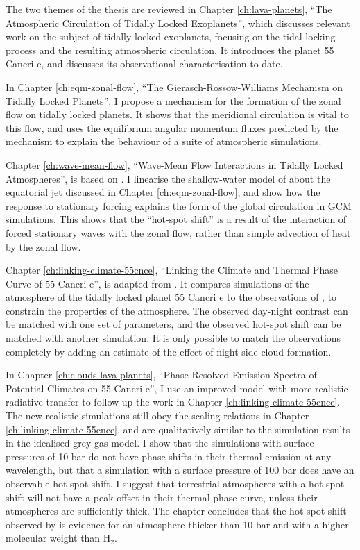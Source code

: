 The two themes of the thesis are reviewed in Chapter \ref{ch:lava-planets}, ``The Atmospheric Circulation of Tidally Locked Exoplanets'', which discusses relevant work on the subject of tidally locked exoplanets, focusing on the tidal locking process and the resulting atmospheric circulation. It introduces the planet 55 Cancri e, and discusses its observational characterisation to date.

In Chapter \ref{ch:eqm-zonal-flow}, ``The Gierasch-Rossow-Williams Mechanism on Tidally Locked Planets'', I propose a mechanism for the formation of the zonal flow on tidally locked planets. It shows that the meridional circulation is vital to this flow, and uses the equilibrium angular momentum fluxes predicted by the mechanism to explain the behaviour of a suite of atmospheric simulations.

Chapter \ref{ch:wave-mean-flow}, ``Wave-Mean Flow Interactions in Tidally Locked Atmospheres'', is based on \citet{hammond2018wavemean}. I linearise the shallow-water model of \citet{showman2011superrotation} about the equatorial jet discussed in Chapter \ref{ch:eqm-zonal-flow}, and show how the response to stationary forcing explains the form of the global circulation in GCM simulations. This shows that the ``hot-spot shift'' is a result of the interaction of forced stationary waves with the zonal flow, rather than simple advection of heat by the zonal flow.

Chapter \ref{ch:linking-climate-55cnce}, ``Linking the Climate and Thermal Phase Curve of 55 Cancri e'', is adapted from \citet{hammond2017climate}. It compares simulations of the atmosphere of the tidally locked planet 55 Cancri e to the observations of \citet{demory201655cnce}, to constrain the properties of the atmosphere. The observed day-night contrast can be matched with one set of parameters, and the observed hot-spot shift can be matched with another simulation. It is only possible to match the observations completely by adding an estimate of the effect of night-side cloud formation.

In Chapter \ref{ch:clouds-lava-planets}, ``Phase-Resolved Emission Spectra of Potential Climates on 55 Cancri e'', I use an improved model with more realistic radiative transfer to follow up the work in Chapter \ref{ch:linking-climate-55cnce}. The new realistic simulations still obey the scaling relations in Chapter \ref{ch:linking-climate-55cnce}, and are qualitatively similar to the simulation results in the idealised grey-gas model. I show that the simulations with surface pressures of 10 bar do not have phase shifts in their thermal emission at any wavelength, but that a simulation with a surface pressure of 100 bar does have an observable hot-spot shift. I suggest that terrestrial atmospheres with a hot-spot shift will not have a peak offset in their thermal phase curve, unless their atmospheres are sufficiently thick. The chapter concludes that the hot-spot shift observed by \citet{demory201655cnce} is evidence for an atmosphere thicker than 10 bar and with a higher molecular weight than H$_{2}$.

